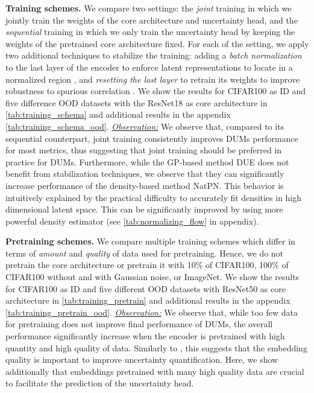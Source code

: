 \textbf{Training schemes.} We compare two settings: the \textit{joint} training in which we jointly train the weights of the core architecture and uncertainty head, and the \textit{sequential} training in which we only train the uncertainty head by keeping the weights of the pretrained core architecture fixed. For each of the setting, we apply two additional techniques to stabilize the training: adding a \textit{batch normalization} to the last layer of the encoder to enforce latent representations to locate in a normalized region \citep{ioffe2015bn,charpentier2022natpn}, and \textit{resetting the last layer} to retrain its weights to improve robustness to spurious correlation \citep{kirichenko2022reset}. We show the results for CIFAR100 as ID and five difference OOD datasets with the ResNet18 as core architecture in \cref{tab:training_schema} and additional results in the appendix \cref{tab:training_schema_ood}.
\underline{\textit{Observation:}} We observe that, compared to its sequential counterpart, joint training consistently improves DUMs performance for most metrics, thus suggesting that joint training should be preferred in practice for DUMs. Furthermore, while the GP-based method DUE does not benefit from stabilization techniques, we observe that they can significantly increase performance of the density-based method NatPN. This behavior is intuitively explained by the practical difficulty to accurately fit densities in high dimensional latent space. This can be significantly improved by using more powerful density estimator (see \cref{tab:normalizing_flow} in appendix).

\textbf{Pretraining schemes.} We compare multiple training schemes which differ in terms of \emph{amount} and \emph{quality} of data used for pretraining. Hence, we do not pretrain the core architecture or pretrain it with 10\% of CIFAR100, 100\% of CIFAR100 without and with Gaussian noise, or ImageNet. We show the results for CIFAR100 as ID and five different OOD datasets with ResNet50 as core architecture in \cref{tab:training_pretrain} and additional results in the appendix \cref{tab:training_pretrain_ood}.
\underline{\textit{Observation:}} We observe that, while too few data for pretraining does not improve final performance of DUMs, the overall performance significantly increase when the encoder is pretrained with high quantity and high quality of data.  Similarly to \citet{kirichenko2020why}, this suggests that the embedding quality is important to improve uncertainty quantification. Here, we show additionally that embeddings pretrained with many high quality data are crucial to facilitate the prediction of the uncertainty head.



